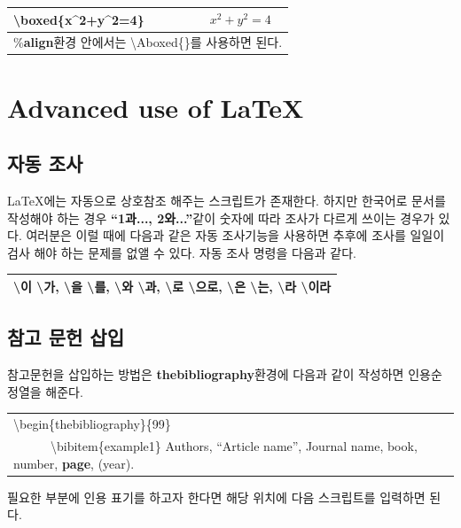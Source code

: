 \documentclass[12pt]{article}
\begin{document}
	\begin{tabularx}{\textwidth\onehalfspacing}{|X|X|}
		\hline
		\textbackslash boxed\{x\textasciicircum2+y\textasciicircum2=4\}&\[\boxed{x^2+y^2=4}\]\\
		\hline
		\multicolumn{2}{|l|}{	\%\textbf{align}환경 안에서는 \textbackslash Aboxed\{\}를 사용하면 된다.}\\
		\hline
	\end{tabularx}\clearpage
	\section{Advanced use of \LaTeX}
	\subsection{자동 조사}
	\LaTeX 에는 자동으로 상호참조 해주는 스크립트가 존재한다. 하지만 한국어로 문서를 작성해야 하는 경우 \textbf{``1과..., 2와...''}같이 숫자에 따라 조사가 다르게 쓰이는 경우가 있다. 여러분은 이럴 때에 다음과 같은 자동 조사기능을 사용하면 추후에 조사를 일일이 검사 해야 하는 문제를 없앨 수 있다.\newline
	자동 조사 명령을 다음과 같다.\newline
	
	\begin{tabularx}{\textwidth\onehalfspacing\large}{|X|}
		\hline
		\textbackslash 이 \textbackslash 가, \textbackslash 을 \textbackslash 를, \textbackslash 와 \textbackslash 과, \textbackslash 로 \textbackslash 으로, \textbackslash 은 \textbackslash 는, \textbackslash 라 \textbackslash 이라\\
		\hline
	\end{tabularx}
	\subsection{참고 문헌 삽입}
	참고문헌을 삽입하는 방법은 \textbf{thebibliography}환경에 다음과 같이 작성하면 인용순 정열을 해준다.\newline
	
	\begin{tabularx}{\textwidth\onehalfspacing}{|X|}
		\hline
		\textbackslash begin\{thebibliography\}\{99\}\\
		\ \ \ \ \ \ \textbackslash bibitem\{example1\} Authors, ``Article name'', Journal name, book, number, \textbf{page}, (year).\\
		\hline
	\end{tabularx}\newline\newline
	필요한 부분에 인용 표기를 하고자 한다면 해당 위치에 다음 스크립트를 입력하면 된다.\newline
	
\end{document}
